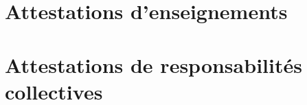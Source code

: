 \documentclass[a4paper,11pt,fleqn]{book} %
\begin{document}
\chapter{Attestations d'enseignements}



\chapter{Attestations de responsabilités collectives}


\end{document}
